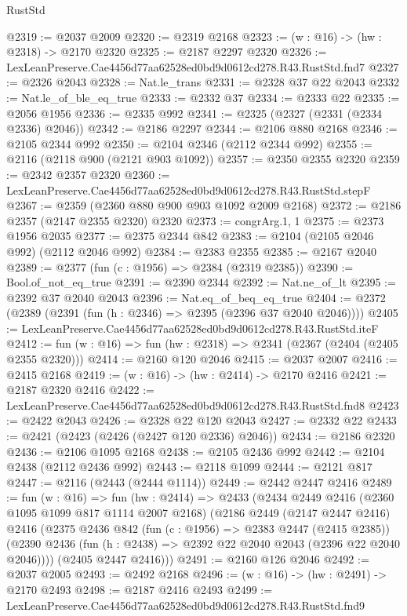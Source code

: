 \begin{lexlean}{RustStd}
\begin{coremodule}
@2319 := @2037 @2009
@2320 := @2319 @2168
@2323 := (w : @16) -> (hw : @2318) -> @2170 @2320
@2325 := @2187 @2297 @2320
@2326 := LexLeanPreserve.Cae4456d77aa62528ed0bd9d0612cd278.R43.RustStd.fnd7
@2327 := @2326 @2043
@2328 := Nat.le_trans
@2331 := @2328 @37 @22 @2043
@2332 := Nat.le_of_ble_eq_true
@2333 := @2332 @37
@2334 := @2333 @22
@2335 := @2056 @1956
@2336 := @2335 @992
@2341 := @2325 (@2327 (@2331 (@2334 @2336) @2046))
@2342 := @2186 @2297
@2344 := @2106 @880 @2168
@2346 := @2105 @2344 @992
@2350 := @2104 @2346 (@2112 @2344 @992)
@2355 := @2116 (@2118 @900 (@2121 @903 @1092))
@2357 := @2350 @2355 @2320
@2359 := @2342 @2357 @2320
@2360 := LexLeanPreserve.Cae4456d77aa62528ed0bd9d0612cd278.R43.RustStd.stepF
@2367 := @2359 (@2360 @880 @900 @903 @1092 @2009 @2168)
@2372 := @2186 @2357 (@2147 @2355 @2320) @2320
@2373 := congrArg.{1, 1}
@2375 := @2373 @1956 @2035
@2377 := @2375 @2344 @842
@2383 := @2104 (@2105 @2046 @992) (@2112 @2046 @992)
@2384 := @2383 @2355
@2385 := @2167 @2040
@2389 := @2377 (fun (c : @1956) => @2384 (@2319 @2385))
@2390 := Bool.of_not_eq_true
@2391 := @2390 @2344
@2392 := Nat.ne_of_lt
@2395 := @2392 @37 @2040 @2043
@2396 := Nat.eq_of_beq_eq_true
@2404 := @2372 (@2389 (@2391 (fun (h : @2346) => @2395 (@2396 @37 @2040 @2046))))
@2405 := LexLeanPreserve.Cae4456d77aa62528ed0bd9d0612cd278.R43.RustStd.iteF
@2412 := fun (w : @16) => fun (hw : @2318) => @2341 (@2367 (@2404 (@2405 @2355 @2320)))
@2414 := @2160 @120 @2046
@2415 := @2037 @2007
@2416 := @2415 @2168
@2419 := (w : @16) -> (hw : @2414) -> @2170 @2416
@2421 := @2187 @2320 @2416
@2422 := LexLeanPreserve.Cae4456d77aa62528ed0bd9d0612cd278.R43.RustStd.fnd8
@2423 := @2422 @2043
@2426 := @2328 @22 @120 @2043
@2427 := @2332 @22
@2433 := @2421 (@2423 (@2426 (@2427 @120 @2336) @2046))
@2434 := @2186 @2320
@2436 := @2106 @1095 @2168
@2438 := @2105 @2436 @992
@2442 := @2104 @2438 (@2112 @2436 @992)
@2443 := @2118 @1099
@2444 := @2121 @817
@2447 := @2116 (@2443 (@2444 @1114))
@2449 := @2442 @2447 @2416
@2489 := fun (w : @16) =>
  fun (hw : @2414) =>
  @2433
    (@2434
      @2449
      @2416
      (@2360 @1095 @1099 @817 @1114 @2007 @2168)
      (@2186
        @2449
        (@2147 @2447 @2416)
        @2416
        (@2375
          @2436
          @842
          (fun (c : @1956) => @2383 @2447 (@2415 @2385))
          (@2390 @2436 (fun (h : @2438) => @2392 @22 @2040 @2043 (@2396 @22 @2040 @2046))))
        (@2405 @2447 @2416)))
@2491 := @2160 @126 @2046
@2492 := @2037 @2005
@2493 := @2492 @2168
@2496 := (w : @16) -> (hw : @2491) -> @2170 @2493
@2498 := @2187 @2416 @2493
@2499 := LexLeanPreserve.Cae4456d77aa62528ed0bd9d0612cd278.R43.RustStd.fnd9

\end{coremodule}
\end{lexlean}
